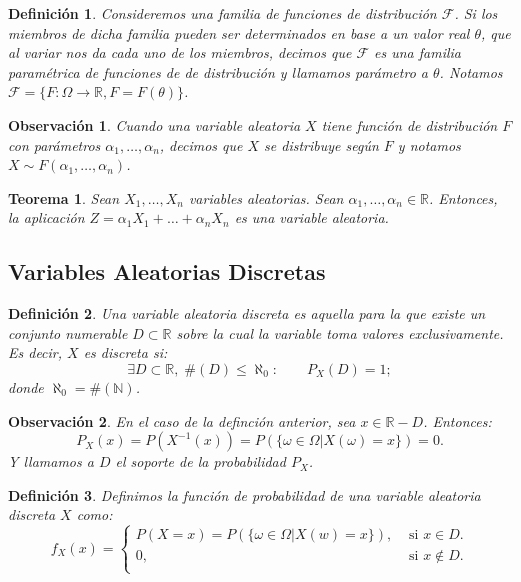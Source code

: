 \documentclass{report}
\newtheorem{thm}{Teorema}[section]
\newtheorem{dfn}{Definición}[section]
\newtheorem{obs}{Observación}[section]
\begin{document}
\begin{dfn}
    Consideremos una familia de funciones de distribución $\mathcal{F}$. Si los miembros de dicha familia pueden ser determinados en base a un
    valor real $\theta$, que al variar nos da cada uno de los miembros, decimos que $\mathcal{F}$ es una familia \emph{paramétrica} de funciones de 
    de distribución y llamamos \emph{parámetro} a $\theta$. Notamos $\mathcal{F}=\{F:\Omega\rightarrow\mathbb{R}, F=F(\theta)\}$.
\end{dfn}

\begin{obs}
    Cuando una variable aleatoria $X$ tiene función de distribución $F$ con parámetros $\alpha_1,\ldots,\alpha_n$, decimos que $X$ \emph{se distribuye} según $F$  y notamos
    $X\sim F(\alpha_1,\ldots,\alpha_n)$.
\end{obs}

\begin{thm}
    Sean $X_1,\ldots, X_n$ variables aleatorias. Sean  $\alpha_1,\ldots, \alpha_n \in \mathbb{R}$. 
    Entonces, la aplicación $Z= \alpha_1 X_1 + \ldots + \alpha_n X_n$ es una variable aleatoria.
\end{thm}

\subsection{Variables Aleatorias Discretas}

\begin{dfn}
Una \emph{variable aleatoria discreta} es aquella para la que existe un conjunto numerable $D\subset \mathbb{R}$ sobre la cual
la variable toma valores exclusivamente. Es decir, $X$ es discreta si:
\begin{equation*}
    \exists D\subset\mathbb{R}, \; \#(D)\leq \aleph_0 : \qquad P_X(D)=1;
\end{equation*}
donde $\aleph_0 = \#(\mathbb{N})$.
\end{dfn}

\begin{obs}
    En el caso de la definción anterior, sea $x\in \mathbb{R}-D$. Entonces:
    \begin{equation*}
    P_X(x) = P(X^{-1}(x))=P\left( \{\omega \in \Omega | X(\omega)=x \} \right) = 0.
    \end{equation*}
    Y llamamos a $D$ el \emph{soporte} de la probabilidad $P_X$.
\end{obs}

\begin{dfn}
    Definimos la función de probabilidad de una variable aleatoria discreta $X$ como:
    \begin{equation*}
        f_X(x)=\begin{cases}
            P(X=x) = P\left( \{\omega \in \Omega | X(w)=x \} \right), &\text{ si } x\in D.\\
            0, &\text{ si } x\notin D.\\
        \end{cases}
    \end{equation*}
\end{dfn}
\end{document}
